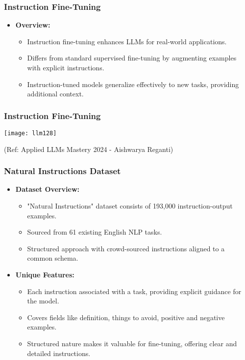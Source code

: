 \begin{frame}[fragile]\frametitle{Instruction Fine-Tuning}
  \begin{itemize}
    \item \textbf{Overview:}
      \begin{itemize}
        \item Instruction fine-tuning enhances LLMs for real-world applications.
        \item Differs from standard supervised fine-tuning by augmenting examples with explicit instructions.
        \item Instruction-tuned models generalize effectively to new tasks, providing additional context.
      \end{itemize}
  \end{itemize}
\end{frame}

\begin{frame}[fragile]\frametitle{Instruction Fine-Tuning}

\begin{center}
\texttt{[image: llm128]}
\end{center}				

{\tiny (Ref: Applied LLMs Mastery 2024 - Aishwarya Reganti)}

\end{frame}


\begin{frame}[fragile]\frametitle{Natural Instructions Dataset}
  \begin{itemize}
    \item \textbf{Dataset Overview:}
      \begin{itemize}
        \item "Natural Instructions" dataset consists of 193,000 instruction-output examples.
        \item Sourced from 61 existing English NLP tasks.
        \item Structured approach with crowd-sourced instructions aligned to a common schema.
      \end{itemize}
    \item \textbf{Unique Features:}
      \begin{itemize}
        \item Each instruction associated with a task, providing explicit guidance for the model.
        \item Covers fields like definition, things to avoid, positive and negative examples.
        \item Structured nature makes it valuable for fine-tuning, offering clear and detailed instructions.
      \end{itemize}
  \end{itemize}
\end{frame}


